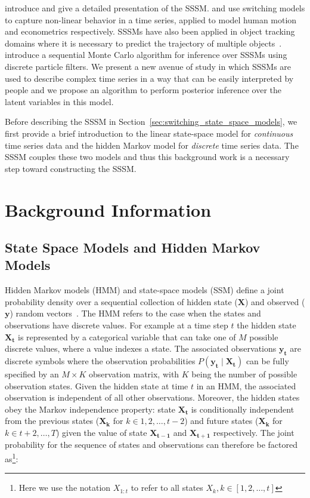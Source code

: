 \citet{ghahramani2000variational} introduce and give a detailed presentation of the SSSM. \citet{pavlovic2001learning} and \citet{giordani2007unified} use switching models to capture non-linear behavior in a time series, applied to model human motion and econometrics respectively. SSSMs have also been applied in object tracking domains where it is necessary to predict the trajectory of multiple objects~\citep{fox2007hierarchical}. \citet{whiteley2010efficient} introduce a sequential Monte Carlo algorithm for inference over SSSMs using discrete particle filters. We present a new avenue of study in which SSSMs are used to describe complex time series in a way that can be easily interpreted by people and we propose an algorithm to perform posterior inference over the latent variables in this model.

Before describing the SSSM in Section~\ref{sec:switching_state_space_models}, we first provide a brief introduction to the linear state-space model for \textit{continuous} time series data and the hidden Markov model for \textit{discrete} time series data. The SSSM couples these two models and thus this background work is a necessary step toward constructing the SSSM.


\section{Background Information}
\subsection{State Space Models and Hidden Markov Models}\label{sec:state_space_and_hidden_markov_models}
Hidden Markov models (HMM) and state-space models (SSM) define a joint probability density over a sequential collection of hidden state ($\mathbf{X}$) and observed ($\mathbf{y}$) random vectors~\citep{ghahramani2001introduction,shumway2000time}. The HMM refers to the case when the states and observations have discrete values. For example at a time step $t$ the hidden state $\mathbf{X_t}$ is represented by a categorical variable that can take one of $M$ possible discrete values, where a value indexes a state. The associated observations $\mathbf{y_t}$ are discrete symbols where the observation probabilities $P(\mathbf{y_t} \mid \mathbf{X_t})$ can be fully specified by an $M \times K$ observation matrix, with $K$ being the number of possible observation states. Given the hidden state at time $t$ in an HMM, the associated observation is independent of all other observations. Moreover, the hidden states obey the Markov independence property: state $\mathbf{X_{t}}$ is conditionally independent from the previous states ($\mathbf{X_{k}}$ for $k \in 1,2, \hdots, t-2$) and future states ($\mathbf{X_{k}}$ for $k \in t+2, \hdots, T$) given the value of state $\mathbf{X_{t-1}}$ and $\mathbf{X_{t+1}}$ respectively. The joint probability for the sequence of states and observations can therefore be factored as\footnote{Here we use the notation $X_{1:t}$ to refer to all states $X_k, k \in [1,2,\hdots,t]$}:

